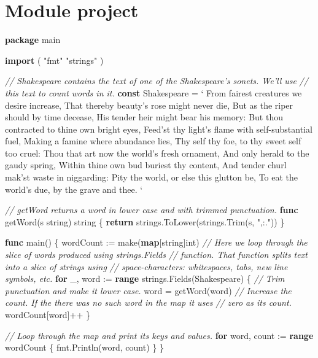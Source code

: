 \documentclass[]{book}
\newenvironment{Shaded}{\begin{snugshade}}{\end{snugshade}}
\newcommand{\BuiltInTok}[1]{#1}
\newcommand{\CommentTok}[1]{\textcolor[rgb]{0.56,0.35,0.01}{\textit{#1}}}
\newcommand{\DataTypeTok}[1]{\textcolor[rgb]{0.13,0.29,0.53}{#1}}
\newcommand{\KeywordTok}[1]{\textcolor[rgb]{0.13,0.29,0.53}{\textbf{#1}}}
\newcommand{\NormalTok}[1]{#1}
\newcommand{\StringTok}[1]{\textcolor[rgb]{0.31,0.60,0.02}{#1}}
\begin{document}
\hypertarget{module-project-2}{%
\section*{Module project}\label{module-project-2}}

\begin{Shaded}
\begin{Highlighting}[]
\KeywordTok{package}\NormalTok{ main}

\KeywordTok{import}\NormalTok{ (}
    \StringTok{"fmt"}
    \StringTok{"strings"}
\NormalTok{)}

\CommentTok{// Shakespeare contains the text of one of the Shakespeare's sonets. We'll use}
\CommentTok{// this text to count words in it.}
\KeywordTok{const}\NormalTok{ Shakespeare = }\StringTok{`}
\StringTok{From fairest creatures we desire increase,}
\StringTok{That thereby beauty's rose might never die,}
\StringTok{But as the riper should by time decease,}
\StringTok{His tender heir might bear his memory:}
\StringTok{But thou contracted to thine own bright eyes,}
\StringTok{Feed'st thy light's flame with self-substantial fuel,}
\StringTok{Making a famine where abundance lies,}
\StringTok{Thy self thy foe, to thy sweet self too cruel:}
\StringTok{Thou that art now the world's fresh ornament,}
\StringTok{And only herald to the gaudy spring,}
\StringTok{Within thine own bud buriest thy content,}
\StringTok{And tender churl mak'st waste in niggarding:}
\StringTok{  Pity the world, or else this glutton be,}
\StringTok{  To eat the world's due, by the grave and thee.}
\StringTok{`}

\CommentTok{// getWord returns a word in lower case and with trimmed punctuation.}
\KeywordTok{func}\NormalTok{ getWord(s }\DataTypeTok{string}\NormalTok{) }\DataTypeTok{string}\NormalTok{ \{}
    \KeywordTok{return}\NormalTok{ strings.ToLower(strings.Trim(s, }\StringTok{",:."}\NormalTok{))}
\NormalTok{\}}

\KeywordTok{func}\NormalTok{ main() \{}
\NormalTok{    wordCount := }\BuiltInTok{make}\NormalTok{(}\KeywordTok{map}\NormalTok{[}\DataTypeTok{string}\NormalTok{]}\DataTypeTok{int}\NormalTok{)}
    \CommentTok{// Here we loop through the slice of words produced using strings.Fields}
    \CommentTok{// function. That function splits text into a slice of strings using}
    \CommentTok{// space-characters: whitespaces, tabs, new line symbols, etc.}
    \KeywordTok{for}\NormalTok{ _, word := }\KeywordTok{range}\NormalTok{ strings.Fields(Shakespeare) \{}
        \CommentTok{// Trim punctuation and make it lower case.}
\NormalTok{        word = getWord(word)}
        \CommentTok{// Increase the count. If the there was no such word in the map it uses}
        \CommentTok{// zero as its count.}
\NormalTok{        wordCount[word]++}
\NormalTok{    \}}

    \CommentTok{// Loop through the map and print its keys and values.}
    \KeywordTok{for}\NormalTok{ word, count := }\KeywordTok{range}\NormalTok{ wordCount \{}
\NormalTok{        fmt.Println(word, count)}
\NormalTok{    \}}
\NormalTok{\}}
\end{Highlighting}
\end{Shaded}
\end{document}
